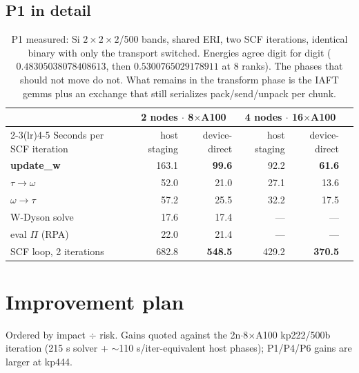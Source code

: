\documentclass[11pt]{article}
\begin{document}
\subsection{P1 in detail}
\begin{table}[H]\small\centering
\begin{tabular}{@{}lrrrrr@{}}
\toprule
& \multicolumn{2}{c}{2 nodes $\cdot$ 8$\times$A100} & \multicolumn{2}{c}{4 nodes $\cdot$ 16$\times$A100} \\
\cmidrule(lr){2-3}\cmidrule(lr){4-5}
Seconds per SCF iteration & host staging & device-direct & host staging & device-direct \\
\midrule
\textbf{update\_w} & 163.1 & \textcolor{good}{\textbf{99.6}} & 92.2 & \textcolor{good}{\textbf{61.6}} \\
\quad $\tau\rightarrow\omega$ & 52.0 & \textcolor{good}{21.0} & 27.1 & \textcolor{good}{13.6} \\
\quad $\omega\rightarrow\tau$ & 57.2 & \textcolor{good}{25.5} & 32.2 & \textcolor{good}{17.5} \\
\quad W-Dyson solve & 17.6 & 17.4 & --- & --- \\
\quad eval $\Pi$ (RPA) & 22.0 & 21.4 & --- & --- \\
\midrule
SCF loop, 2 iterations & 682.8 & \textcolor{good}{\textbf{548.5}} & 429.2 & \textcolor{good}{\textbf{370.5}} \\
\bottomrule
\end{tabular}
\caption{\label{tab:p1}P1 measured: Si $2{\times}2{\times}2$/500 bands, shared ERI, two SCF
iterations, identical binary with only the transport switched. Energies agree digit for
digit ($0.48305038078408613$, then $0.5300765029178911$ at 8 ranks). The phases that
should not move do not. What remains in the transform phase is the IAFT gemms plus an
exchange that still serializes pack/send/unpack per chunk.}
\end{table}

\section{Improvement plan}
Ordered by impact $\div$ risk. Gains quoted against the 2n$\cdot$8$\times$A100
kp222/500b iteration (215 s solver + $\sim$110 s/iter-equivalent host phases);
P1/P4/P6 gains are larger at kp444.
\end{document}
